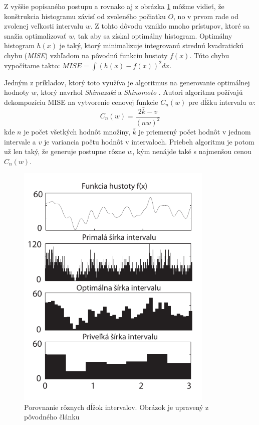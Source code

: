 Z vyššie popísaného postupu a rovnako aj z obrázka \ref{fig:binsizehistogram} môžme vidieť, že konštrukcia histogramu závisí od zvoleného počiatku $ O $, no v prvom rade od zvolenej veľkosti intervalu $ w $. Z tohto dôvodu vzniklo mnoho prístupov, ktoré sa snažia optimalizovať $ w $, tak aby sa získal optimálny histogram. Optimálny histogram $ h(x) $ je taký, ktorý minimalizuje integrovanú strednú kvadratickú chybu (\textit{MISE}) vzhľadom na pôvodnú funkciu hustoty $ f(x) $. Túto chybu vypočítame takto: $ MISE = \int (h(x) - f(x))^2 dx $. 

Jedným z príkladov, ktorý toto využíva je algoritmus na generovanie optimálnej hodnoty $ w $, ktorý navrhol \textit{Shimazaki} a \textit{Shinomoto} \cite{OptBinSize}. Autori algoritmu požívajú dekompozíciu MISE na vytvorenie cenovej funkcie $ C_{n}(w) $ pre dĺžku intervalu $ w $:
\[
	C_{n}(w) = \frac{2\bar{k} - v}{(nw)^2}
\]
kde $ n $ je počet všetkých hodnôt množiny, $ \bar{k}$ je priemerný počet hodnôt v jednom intervale a $ v $ je variancia počtu hodnôt v intervaloch. Priebeh algoritmu je potom už len taký, že generuje postupne rôzne $ w $, kým nenájde také s najmenšou cenou $ C_{n}(w) $. 

\begin{figure}
	\centering
	\includegraphics[width = 3.7in]{binsizehistogram}
	\caption{ Porovnanie rôznych dĺžok intervalov. Obrázok je upravený z pôvodného článku \cite{OptBinSize} }
	\label{fig:binsizehistogram}
\end{figure}

